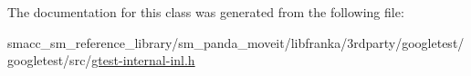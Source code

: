 The documentation for this class was generated from the following file\+:\begin{DoxyCompactItemize}
\item 
smacc\+\_\+sm\+\_\+reference\+\_\+library/sm\+\_\+panda\+\_\+moveit/libfranka/3rdparty/googletest/googletest/src/\hyperlink{gtest-internal-inl_8h}{gtest-\/internal-\/inl.\+h}\end{DoxyCompactItemize}
